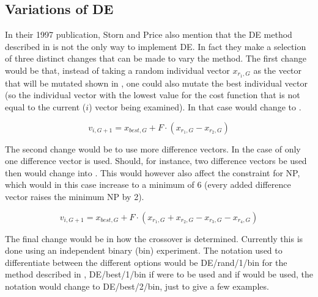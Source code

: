 
\subsection{Variations of \ac{DE}}
\label{subsec:vardemeth}
In their 1997 publication, Storn and Price also mention that the \ac{DE} method described in  is not the only way to implement \ac{DE}. In fact they make a selection of three distinct changes that can be made to vary the method. The first change would be that, instead of taking a random individual vector $x_{r_{1},G}$ as the vector that will be mutated shown in , one could also mutate the best individual vector (so the individual vector with the lowest value for the cost function that is not equal to the current ($i$) vector being examined). In that case  would change to .

\begin{equation} \label{eq:best_mutation vector}
v_{i,G+1}=x_{best,G}+F\cdot\left(x_{r_{1},G}-x_{r_{2},G}\right)
\end{equation}

The second change would be to use more difference vectors. In the case of  only one difference vector is used. Should, for instance, two difference vectors be used then  would change into  \cite{storn1997differential}.
This would however also affect the constraint for NP, which would in this case increase to a minimum of 6 (every added difference vector raises the minimum NP by 2).


\begin{equation} \label{eq:best_2mutation vector}
v_{i,G+1}=x_{best,G}+F\cdot\left(x_{r_{1},G}+x_{r_{2},G}-x_{r_{3},G}-x_{r_{4},G}\right)
\end{equation}

The final change would be in how the crossover is determined. Currently this is done using an independent binary (bin) experiment. The notation used to differentiate between the different options would be DE/rand/1/bin for the method described in , DE/best/1/bin if  were to be used and if  would be used, the notation would change to DE/best/2/bin, just to give a few examples.\\

